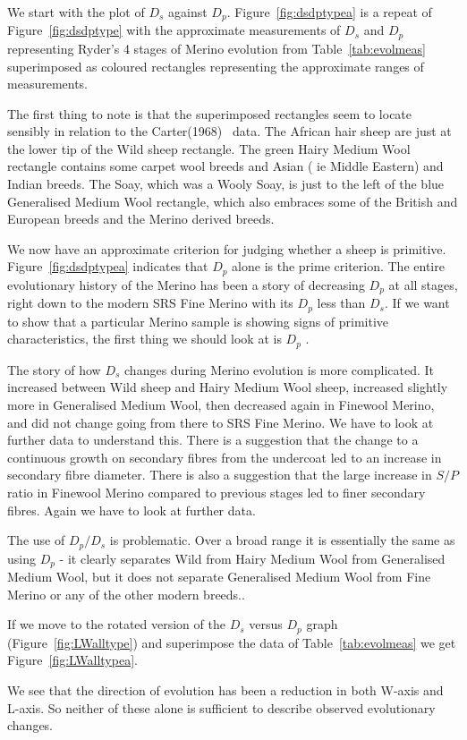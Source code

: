 \documentclass[titlepage]{article}  %
\begin{document}
We start with the  plot of $D_{s}$ against $D_{p}$. Figure~\ref{fig:dsdptypea} is a repeat of Figure~\ref{fig:dsdptype} with the approximate measurements of $D_{s}$ and $D_{p}$ representing Ryder's 4 stages of Merino evolution from Table~\ref{tab:evolmeas} superimposed as coloured rectangles representing the approximate ranges of measurements. 

The first thing to note is that the superimposed rectangles seem to locate sensibly in relation to the Carter(1968)~\cite{cart:68} data. The African hair sheep are just at the lower tip of the Wild sheep rectangle. The green Hairy Medium Wool rectangle contains some carpet wool breeds and Asian ( ie Middle Eastern) and Indian breeds. The Soay, which was a Wooly Soay, is just to the left of the blue Generalised Medium Wool rectangle, which also embraces some of the British and European  breeds and the Merino derived breeds.

We now have an approximate criterion for judging whether a sheep is primitive. Figure~\ref{fig:dsdptypea} indicates that $D_{p}$ alone is the prime criterion. The entire evolutionary history of the Merino has been a story of decreasing $D_{p}$ at all stages, right down to the modern SRS Fine Merino with its $D_{p}$ less than $D_{s}$.  If we want to show that a particular Merino sample is showing signs of primitive characteristics, the first thing we should look at is  $D_{p}$ .

The story of how $D_{s}$ changes during Merino evolution is more complicated.  It increased between Wild sheep and Hairy Medium Wool sheep, increased slightly more in Generalised Medium Wool, then decreased again in Finewool Merino, and did not change going from there to SRS Fine Merino. We have to look at further data to understand this. There is a suggestion that the change to a continuous growth on secondary fibres from the undercoat led to an increase in secondary fibre diameter. There is also a suggestion that the large increase in $S/P$ ratio in Finewool Merino compared to previous stages led to finer secondary fibres. Again we have to look at further data. 

The use of $D_{p}/D_{s}$ is problematic. Over a broad range it is essentially the same as using $D_{p}$ - it clearly separates Wild from Hairy Medium Wool from Generalised Medium Wool, but it does not separate Generalised Medium Wool from Fine Merino or any of the other modern breeds.. 

If we move to the rotated version of the $D_{s}$ versus $D_{p}$ graph (Figure~\ref{fig:LWalltype}) and superimpose the data of Table~\ref{tab:evolmeas} we get Figure~\ref{fig:LWalltypea}.

We see that the direction of evolution has been a reduction in both W-axis and L-axis. So neither of these alone is sufficient to describe observed evolutionary changes.
\end{document}
